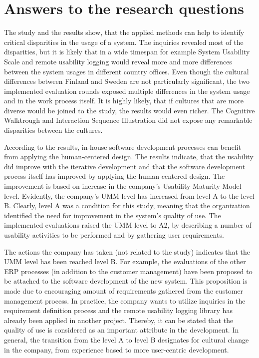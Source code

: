 \documentclass[12pt,a4paper,oneside,pdftex]{report}
\begin{document}
\section{Answers to the research questions}

The study and the results show, that the applied methods can help to identify critical disparities in the usage of a system. The inquiries revealed most of the disparities, but it is likely that in a wide timespan for example System Usability Scale and remote usability logging would reveal more and more differences between the system usages in different country offices. Even though the cultural differences between Finland and Sweden are not particularly significant, the two implemented evaluation rounds exposed multiple differences in the system usage and in the work process itself. It is highly likely, that if cultures that are more diverse would be joined to the study, the results would even richer. The Cognitive Walktrough and Interaction Sequence Illustration did not expose any remarkable disparities between the cultures. 

According to the results, in-house software development processes can benefit from applying the human-centered design. The results indicate, that the usability did improve with the iterative development and that the software development process itself has improved by applying the human-centered design. The improvement is based on increase in the company's Usability Maturity Model level. Evidently, the company's UMM level has increased from level A to the level B. Clearly, level A was a condition for this study, meaning that the organization identified the need for improvement in the system's quality of use. The implemented evaluations raised the UMM level to A2, by describing a number of usability activities to be performed and by gathering user requirements. 

The actions the company has taken (not related to the study) indicates that the UMM level has been reached level B. For example, the evaluations of the other ERP processes (in addition to the customer management) have been proposed to be attached to the software development of the new system. This proposition is made due to encouraging amount of requirements gathered from the customer management process. In practice, the company wants to utilize inquiries in the requirement definition process and the remote usability logging library has already been applied in another project. Thereby, it can be stated that the quality of use is considered as an important attribute in the development. In general, the transition from the level A to level B designates for cultural change in the company, from experience based to more user-centric development. 
\end{document}
